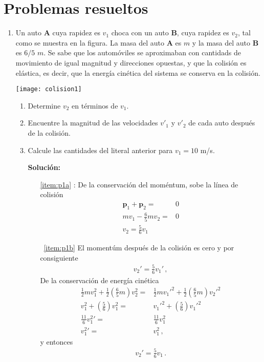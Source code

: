 \section{Problemas resueltos}
\begin{enumerate}
\item Un auto \textbf{A} cuya rapidez es $v_1$ choca con un auto \textbf{B}, cuya rapidez es $v_2$, tal como se muestra en la figura. La masa del auto \textbf{A} es $m$ y la masa del auto \textbf{B} es $6/5$ $m$. Se sabe que los automóviles se aproximaban con cantidads de movimiento de igual magnitud y direcciones opuestas, y que la colisión es elástica, es decir, que la energía cinética del sistema se conserva en la colisión.

  \begin{minipage}{0.4\linewidth}
    \texttt{[image: colision1]}    
  \end{minipage}  \begin{minipage}{0.6\linewidth}
    \begin{enumerate}
    \item Determine  $v_2$ en términos de $v_1$.%
      \label{item:p1a}
    \item Encuentre la magnitud de las velocidades $v'_1$ y $v'_2$ de cada auto después de la colisión.
      \label{item:p1b}
    \item Calcule las cantidades del literal anterior para  $v_1=10$ m/s. 
      \label{item:p1c}
    \end{enumerate}
  \end{minipage}
\begin{itemize}
\item[\textbf{Solución:}]
  \begin{itemize}
  \item[\ref{item:p1a}]: De la conservación del moméntum, sobe la línea de colisión
    \begin{align*}
      \mathbf{p}_1+\mathbf{p}_2=&0\nonumber\\
      m v_1-\tfrac{6}{5}m v_2=&0\nonumber\\
      v_2=\tfrac{5}{6}v_1
    \end{align*}
  \item[~\ref{item:p1b}]
    El momentúm después de la colisión es cero y por consiguiente
\begin{align*}
  v_2'=\tfrac{5}{6}v_1'\,,
\end{align*}
De la conservación de energía cinética
\begin{align*}
  \tfrac{1}{2}m v_1^2+\tfrac{1}{2}(\tfrac{6}{5}m)  v_2^2=&
  \tfrac{1}{2}m {v_1'}^2+\tfrac{1}{2}(\tfrac{6}{5}m)  {v_2'}^2\nonumber\\
  v_1^2+(\tfrac{5}{6})  v_1^2=&
  {v_1'}^2+(\tfrac{5}{6}) {v_1'}^2\nonumber\\
  \frac{11}{6}{v_1^2}'=&\frac{11}{6}v_1^2\nonumber\\
  {v_1^2}'=&v_1^2\,,
\end{align*}
y entonces
\begin{align*}
 v_2'=\tfrac{5}{6}v_1\,.
\end{align*}


\end{itemize}
\end{itemize}
\end{enumerate}
